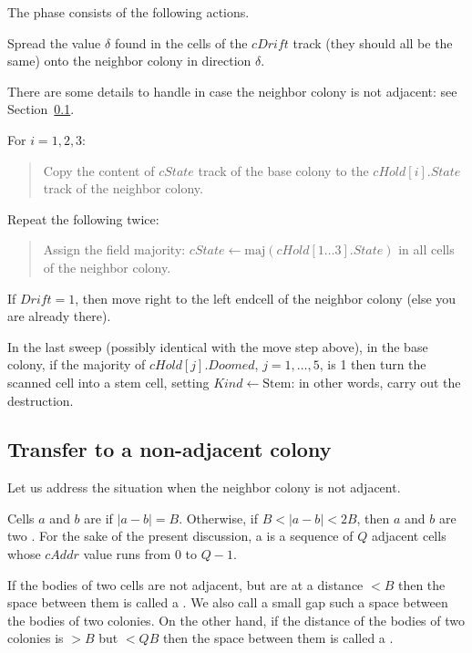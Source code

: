 \documentclass[12pt]{memoir}
\newcommand{\fld}[1]{\ensuremath{\textit{#1}}}
\newcommand{\maj}{\mathrm{maj}}
\renewcommand{\B}{B}
\newcommand{\cAddr}{\fld{cAddr}}
\newcommand{\Drift}{\fld{Drift}}
\newcommand{\Doomed}{\fld{Doomed}}
\newcommand{\cDrift}{\fld{cDrift}}
\newcommand{\cHold}{\fld{cHold}}
\newcommand{\Kind}{\fld{Kind}}
\newcommand{\State}{\fld{State}}
\newcommand{\cState}{\fld{cState}}
\newcommand{\Stem}{\mathrm{Stem}}
\begin{document}
The phase consists of the following actions.
\begin{enumerate}[1.]
\item
  Spread the value \( \delta \) found in the cells of the \( \cDrift \) track
  (they should all be the same)
  onto the neighbor colony in direction \( \delta \).

There are some details to handle in case the neighbor colony is not adjacent:
see Section~\ref{sec:adjacency}.

\item\label{i:transfer-state} For \( i=1,2,3 \):
        \begin{quote}
          Copy the content of \( \cState \) track of the base colony
            to the \( \cHold[i].\State \) track of the neighbor colony.
        \end{quote}

\item Repeat the following twice:
  \begin{quote}
 Assign the field majority: \( \cState\gets \maj(\cHold[1 \dots  3].\State) \)
in all cells of the neighbor colony.    
  \end{quote}
  
\item If \( \Drift = 1 \), then move right to the left endcell of the neighbor colony
(else you are already there).

        \begin{sloppypar}
          \item In the last sweep (possibly identical with the move step above), in the base colony,
            if the majority of \( \cHold[j].\Doomed \), \( j=1,\dots,5 \), is 1 then
            turn the scanned cell into a stem cell, setting \( \Kind\gets\Stem \): in other
            words, carry out the destruction.            
          \end{sloppypar}


\end{enumerate}

\subsection{Transfer to a non-adjacent colony}\label{sec:adjacency}

Let us address the situation when the neighbor colony is not adjacent.

\begin{definition}\label{def:adjacent}
  Cells $a$ and $b$ are  if $|a-b|=\B$.
  Otherwise, if $\B < | a- b| < 2\B$, then
  $a$ and $b$ are two .
For the sake of the present discussion, a  is a sequence of \( Q \) adjacent
cells whose \( \cAddr \) value runs from \( 0 \) to \( Q-1 \).

If the bodies of two cells are not adjacent, but are at a distance \( <\B \) then the space
between them is called a .
We also call a small gap such a space between the bodies of two colonies.
On the other hand, if the distance of the bodies of two colonies is \( >\B \) 
but \( <Q\B \) then the space between them is called a .
\end{definition}
\end{document}
